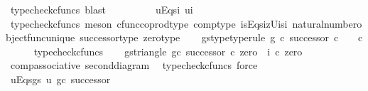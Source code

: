 \begin{isabellebody}
\ {\isacharparenleft}{\kern0pt}typecheck{\isacharunderscore}{\kern0pt}cfuncs{\isacharcomma}{\kern0pt}\ blast{\isacharparenright}{\kern0pt}\ \ \ \ \isanewline
\ \ \isamarkupfalse%
\ \isamarkupfalse%
\ u{\isacharunderscore}{\kern0pt}Eqs{\isacharunderscore}{\kern0pt}i{}{\isacharcolon}{\kern0pt}\ {\isachardoublequoteopen}u{\isacharequal}{\kern0pt}i{}{\isachardoublequoteclose}\isanewline
\ \ \ \ \isamarkupfalse%
\ {\isacharparenleft}{\kern0pt}typecheck{\isacharunderscore}{\kern0pt}cfuncs{\isacharcomma}{\kern0pt}\ meson\ cfunc{\isacharunderscore}{\kern0pt}coprod{\isacharunderscore}{\kern0pt}type\ comp{\isacharunderscore}{\kern0pt}type\ i{}{\isacharunderscore}{\kern0pt}sEqs{\isacharunderscore}{\kern0pt}i{}zUi{}s{\isacharunderscore}{\kern0pt}i{}\ natural{\isacharunderscore}{\kern0pt}number{\isacharunderscore}{\kern0pt}object{\isacharunderscore}{\kern0pt}func{\isacharunderscore}{\kern0pt}unique\ successor{\isacharunderscore}{\kern0pt}type\ zero{\isacharunderscore}{\kern0pt}type{\isacharparenright}{\kern0pt}\isanewline
\ \ \isamarkupfalse%
\ g{\isacharunderscore}{\kern0pt}s{\isacharunderscore}{\kern0pt}type{\isacharbrackleft}{\kern0pt}type{\isacharunderscore}{\kern0pt}rule{\isacharbrackright}{\kern0pt}{\isacharcolon}{\kern0pt}\ {\isachardoublequoteopen}g\ {\isasymcirc}\isactrlsub c\ successor{\isacharcolon}{\kern0pt}\ {\isasymnat}\isactrlsub c\ {\isasymrightarrow}\ {\isacharparenleft}{\kern0pt}{\isasymone}\ {\isasymCoprod}\ {\isasymnat}\isactrlsub c{\isacharparenright}{\kern0pt}{\isachardoublequoteclose}\isanewline
\ \ \ \ \isamarkupfalse%
\ typecheck{\isacharunderscore}{\kern0pt}cfuncs\isanewline
\ \ \isamarkupfalse%
\ g{\isacharunderscore}{\kern0pt}s{\isacharunderscore}{\kern0pt}triangle{\isacharcolon}{\kern0pt}\ {\isachardoublequoteopen}{\isacharparenleft}{\kern0pt}g{\isasymcirc}\isactrlsub c\ successor{\isacharparenright}{\kern0pt}\ {\isasymcirc}\isactrlsub c\ zero\ {\isacharequal}{\kern0pt}\ i{}\ {\isasymcirc}\isactrlsub c\ zero{\isachardoublequoteclose}\isanewline
\ \ \ \ \isamarkupfalse%
\ comp{\isacharunderscore}{\kern0pt}associative{}\ second{\isacharunderscore}{\kern0pt}diagram{}\ \isamarkupfalse%
\ {\isacharparenleft}{\kern0pt}typecheck{\isacharunderscore}{\kern0pt}cfuncs{\isacharcomma}{\kern0pt}\ force{\isacharparenright}{\kern0pt}\isanewline
\ \ \isamarkupfalse%
\ \isamarkupfalse%
\ u{\isacharunderscore}{\kern0pt}Eqs{\isacharunderscore}{\kern0pt}g{\isacharunderscore}{\kern0pt}s{\isacharcolon}{\kern0pt}\ {\isachardoublequoteopen}u{\isacharequal}{\kern0pt}\ g{\isasymcirc}\isactrlsub c\ successor{\isachardoublequoteclose}\isanewline

\end{isabellebody}
